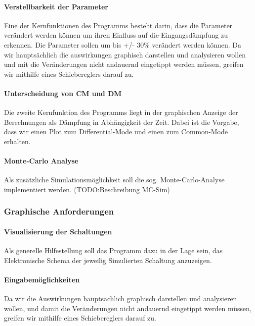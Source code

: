 \paragraph{Verstellbarkeit der Parameter}\label{para:verstellbarkeitderparameter}
Eine der Kernfunktionen des Programms besteht darin, dass die Parameter verändert werden können um ihren Einfluss auf die Eingangsdämpfung zu erkennen. Die Parameter sollen um bis +/- 30\% verändert werden können. 		Da wir hauptsächlich die auswirkungen graphisch darstellen und analysieren wollen und mit die Veränderungen nicht andauernd eingetippt werden müssen, greifen wir mithilfe eines Schiebereglers darauf zu. 
\bigskip
\paragraph{Unterscheidung von CM und DM}\label{para:unterscheidcmdm}
		Die zweite Kernfunktion des Programms liegt in der graphischen Anzeige der Berechnungen als Dämpfung in Abhängigkeit der Zeit. Dabei ist die Vorgabe, dass wir einen Plot zum Differential-Mode und einen zum Common-Mode erhalten.
		
\bigskip
\paragraph{Monte-Carlo Analyse}\label{para:montecarlo}
Als zusätzliche Simulationsmöglichkeit soll die sog. Monte-Carlo-Analyse implementiert werden. (TODO:Beschreibung MC-Sim)
		
		
\subsubsection{Graphische Anforderungen} \label{subsubsec:graphischeanforderungen}

\bigskip
{}
\paragraph{Visualisierung der Schaltungen} \label{para:visualisierungderschaltungen}
Als generelle Hilfestellung soll das Programm dazu in der Lage sein, das Elektronische Schema der jeweilig Simulierten Schaltung anzuzeigen.
\bigskip
\paragraph{Eingabemöglichkeiten}\label{para:eingabemöglichkeiten}
		Da wir  die Auswirkungen hauptsächlich graphisch darstellen und analysieren wollen, und damit die Veränderungen nicht andauernd eingetippt werden müssen, greifen wir mithilfe eines Schiebereglers darauf zu.
\bigskip
